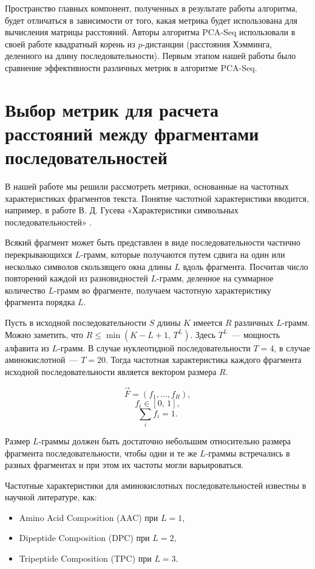 Пространство главных компонент, полученных в результате работы алгоритма, будет отличаться в зависимости от того, какая метрика будет использована для вычисления матрицы расстояний. Авторы алгоритма PCA-Seq использовали в своей работе квадратный корень из $p$-дистанции (расстояния Хэмминга, деленного на длину последовательности). Первым этапом нашей работы было сравнение эффективности различных метрик в алгоритме PCA-Seq.

\section{Выбор метрик для расчета расстояний между фрагментами последовательностей}

В нашей работе мы решили рассмотреть метрики, основанные на частотных характеристиках фрагментов текста. Понятие частотной характеристики вводится, например, в работе В. Д. Гусева «Характеристики символьных последовательностей» \cite{gusev}.

Всякий фрагмент может быть представлен в виде последовательности частично перекрывающихся $L$-грамм, которые получаются путем сдвига на один или несколько символов скользящего окна длины $L$ вдоль фрагмента. Посчитав число повторений каждой из разновидностей $L$-грамм, деленное на суммарное количество $L$-грамм во фрагменте, получаем частотную характеристику фрагмента порядка $L$.

Пусть в исходной последовательности $S$ длины $K$ имеется $R$ различных $L$-грамм. Можно заметить, что $R\leqslant\min(K-L+1,\, T^L)$. Здесь $T^L$~--- мощность алфавита из $L$-грамм. В случае нуклеотидной последовательности $T=4$, в случае аминокислотной~--- $T = 20$. Тогда частотная характеристика каждого фрагмента исходной последовательности является вектором размера $R$.

\newpage
$$\vec{F} = (f_1,\ldots,f_R),$$
$$f_i \in [0,\,1],$$
$$\sum_i f_i = 1.$$

Размер $L$-граммы должен быть достаточно небольшим относительно размера фрагмента последовательности, чтобы одни и те же $L$-граммы встречались в разных фрагментах и при этом их частоты могли варьироваться.

Частотные характеристики для аминокислотных последовательностей известны \cite{Bhasin2004} в научной литературе, как:
\begin{itemize}
  \item Amino Acid Composition (AAC) при $L = 1$,
  \item Dipeptide Composition (DPC) при  $L = 2$,
  \item Tripeptide Composition (TPC) при  $L = 3$.
\end{itemize}

